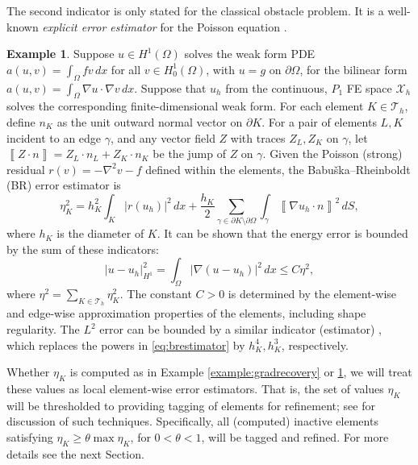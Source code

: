 \documentclass[]{interact}
\theoremstyle{plain}%
\theoremstyle{definition}
\newtheorem{example}[theorem]{Example}
\theoremstyle{remark}
\newcommand{\grad}{\nabla}
\newcommand{\cT}{\mathcal{T}}
\newcommand{\cX}{\mathcal{X}}
\begin{document}
The second indicator is only stated for the classical obstacle problem.  It is a well-known \emph{explicit error estimator} for the Poisson equation \cite[Chapter 2]{AinsworthOden2000}.

\begin{example}  \label{example:br}  Suppose $u \in H^1(\Omega)$ solves the weak form PDE $a(u,v) = \int_\Omega f v\,dx$ for all $v \in H^1_0(\Omega)$, with $u=g$ on $\partial \Omega$, for the bilinear form $a(u,v)=\int_\Omega \grad u\cdot \grad v\,dx$.  Suppose that $u_h$ from the continuous, $P_1$ FE space $\cX_h$ solves the corresponding finite-dimensional weak form.  For each element $K \in \cT_h$, define $n_K$ as the unit outward normal vector on $\partial K$.  For a pair of elements $L,K$ incident to an edge $\gamma$, and any vector field $Z$ with traces $Z_L,Z_K$ on $\gamma$, let $\left\llbracket Z \cdot n \right\rrbracket = Z_L \cdot n_L + Z_K \cdot n_K$ be the jump of $Z$ on $\gamma$.  Given the Poisson (strong) residual $r(v)=-\nabla^2 v - f$ defined within the elements, the Babu\v{s}ka--Rheinboldt (BR) \cite{BabuskaRheinboldt1979} error estimator is
\begin{equation} \label{eq:brestimator}
\eta_K^2 = h_K^2 \int_K |r(u_h)|^2\,dx + \frac{h_K}{2} \sum_{\gamma \in \partial K \setminus \partial \Omega} \int_{\gamma} \left\llbracket \grad u_h \cdot n \right\rrbracket^2\,dS,
\end{equation}
where $h_K$ is the diameter of $K$.  It can be shown \cite[Chapter 2]{AinsworthOden2000} that the energy error is bounded by the sum of these indicators:
\begin{equation} \label{eq:brbound}
|u-u_h|_{H^1}^2 = \int_\Omega |\grad(u-u_h)|^2\,dx \le C \eta^2,
\end{equation}
where $\eta^2 = \sum_{K\in\cT_h} \eta_K^2$.  The constant $C>0$ is determined by the element-wise and edge-wise approximation properties of the elements, including shape regularity.  The $L^2$ error can be bounded by a similar indicator (estimator) \cite[Section 2.4]{AinsworthOden2000}, which replaces the powers in \eqref{eq:brestimator} by $h_K^4,h_K^3$, respectively.
\end{example}

Whether $\eta_K$ is computed as in Example \ref{example:gradrecovery} or \ref{example:br}, we will treat these values as local element-wise error estimators.  That is, the set of values $\eta_K$ will be thresholded to providing tagging of elements for refinement; see \cite[Section 4.2]{BangerthRannacher2003} for discussion of such techniques.  Specifically, all (computed) inactive elements satisfying $\eta_K \ge \theta \max \eta_K$, for $0<\theta<1$, will be tagged and refined.  For more details see the next Section.
\end{document}

